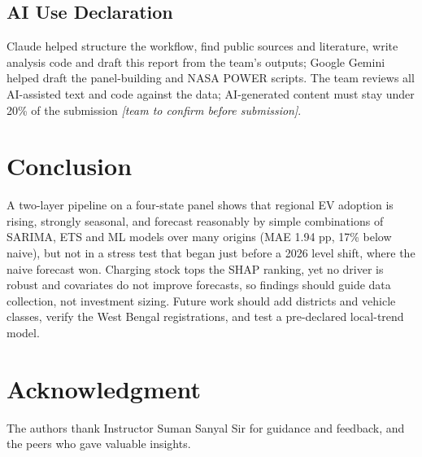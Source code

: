 \subsection{AI Use Declaration}
Claude helped structure the workflow, find public sources and literature, write analysis code and draft this report from the team's outputs; Google Gemini helped draft the panel-building and NASA POWER scripts. The team reviews all AI-assisted text and code against the data; AI-generated content must stay under 20\% of the submission \emph{[team to confirm before submission]}. %

\section{Conclusion}
A two-layer pipeline on a four-state panel shows that regional EV adoption is rising, strongly seasonal, and forecast reasonably by simple combinations of SARIMA, ETS and ML models over many origins (MAE 1.94 pp, 17\% below naive), but not in a stress test that began just before a 2026 level shift, where the naive forecast won. Charging stock tops the SHAP ranking, yet no driver is robust and covariates do not improve forecasts, so findings should guide data collection, not investment sizing. Future work should add districts and vehicle classes, verify the West Bengal registrations, and test a pre-declared local-trend model.

\section*{Acknowledgment}
The authors thank Instructor Suman Sanyal Sir for guidance and feedback, and the peers who gave valuable insights.
